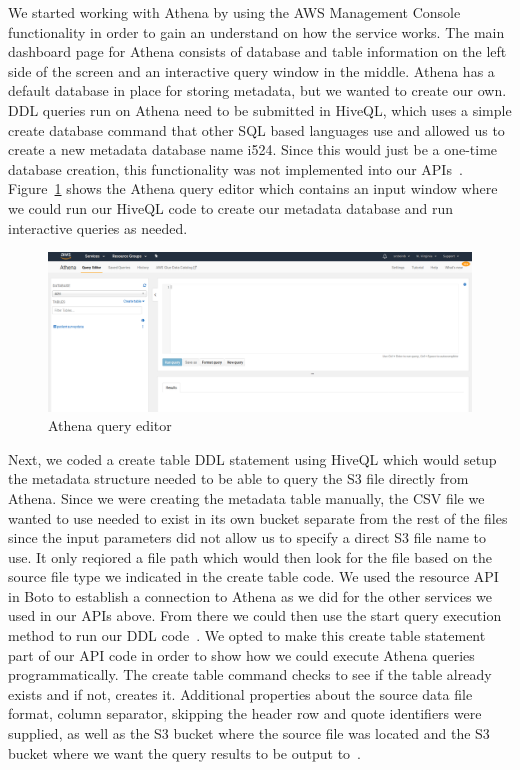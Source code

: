 We started working with Athena by using the AWS Management Console 
functionality in order to gain an understand on how the service works. 
The main dashboard page for Athena consists of database and table information 
on the left side of the screen and an interactive query window in the middle. 
Athena has a default database in place for storing metadata, but we wanted to 
create our own. DDL queries run on Athena need to be submitted in 
HiveQL, which uses a simple create database command that other SQL based 
languages use and allowed us to create a new metadata database name i524. 
Since this would just be a one-time database creation, this functionality was 
not implemented into our APIs~\cite{hid-sp18-521-whatisathena}. 
Figure~\ref{f:athena} shows the Athena query editor which contains an input 
window where we could run our HiveQL code to create our metadata database
and run interactive queries as needed.

\begin{figure}[!ht]
  \centering\includegraphics[width=\columnwidth]{images/athena.png}
  \caption{Athena query editor}\label{f:athena}
\end{figure}  

Next, we coded a create table DDL statement using HiveQL which would setup the 
metadata structure needed to be able to query the S3 file directly from 
Athena. Since we were creating the metadata table manually, the CSV file we 
wanted to use needed to exist in its own bucket separate from the rest of the 
files since the input parameters did not allow us to specify a direct S3 
file name to use. It only reqiored a file path which would then look for the 
file based on the source file type we indicated in the create table code. We 
used the resource API in Boto to establish a connection to Athena as we did 
for the other services we used in our APIs above. From there we could then use 
the start query execution method to run our DDL 
code~\cite{hid-sp18-521-boto-athena}. We opted to make this create table 
statement part of our API code in order to show how we could execute Athena 
queries programmatically. The create table command checks to see if the table 
already exists and if not, creates it. Additional properties about the source 
data file format, column separator, skipping the header row and quote 
identifiers were supplied, as well as the S3 bucket where the source file was 
located and the S3 bucket where we want the query results to be output 
to~\cite{hid-sp18-521-athena-gettingstarted}. 

